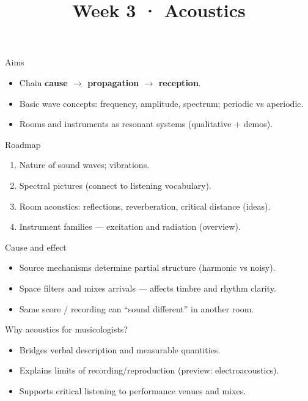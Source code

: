 \documentclass[aspectratio=169]{beamer}
\title{Week 3 · Acoustics}
\subtitle{\coursename}
\institute{\instituteuo}
\date{}
\begin{document}
\begin{frame}
  \titlepage
\end{frame}

\begin{frame}{Aims}
  \begin{itemize}
    \item Chain \textbf{cause $\rightarrow$ propagation $\rightarrow$ reception}.
    \item Basic wave concepts: frequency, amplitude, spectrum; periodic vs aperiodic.
    \item Rooms and instruments as resonant systems (qualitative + demos).
  \end{itemize}
\end{frame}

\begin{frame}{Roadmap}
  \begin{enumerate}
    \item Nature of sound waves; vibrations.
    \item Spectral pictures (connect to listening vocabulary).
    \item Room acoustics: reflections, reverberation, critical distance (ideas).
    \item Instrument families — excitation and radiation (overview).
  \end{enumerate}
\end{frame}

\begin{frame}{Cause and effect}
  \begin{itemize}
    \item Source mechanisms determine partial structure (harmonic vs noisy).
    \item Space filters and mixes arrivals — affects timbre and rhythm clarity.
    \item Same score / recording can ``sound different'' in another room.
  \end{itemize}
\end{frame}

\begin{frame}{Why acoustics for musicologists?}
  \begin{itemize}
    \item Bridges verbal description and measurable quantities.
    \item Explains limits of recording/reproduction (preview: electroacoustics).
    \item Supports critical listening to performance venues and mixes.
  \end{itemize}
\end{frame}
\end{document}
